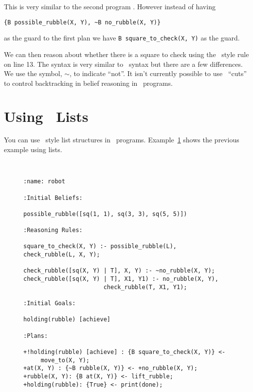 This is very similar to the second program .  However instead of having 
\begin{verbatim}
{B possible_rubble(X, Y), ~B no_rubble(X, Y)}
\end{verbatim}as the guard to the first plan we have \lstinline{B square_to_check(X, Y)} as the guard.

We can then reason about whether there is a square to check using the
\prolog\ style rule on line 13.  The syntax is very similar to
\prolog\ syntax but there are a few
differences.  We use the symbol,
$\sim$, to indicate ``not''.  It isn't currently possible to use
\prolog\ ``cuts'' to control backtracking in belief reasoning in
\gwendolen\ programs. 

\section{Using \prolog\ Lists}
You can use \prolog\ style list structures in \gwendolen\ programs.
Example~\ref{code:pickuprubble_list} shows the previous example using
lists. 
\begin{figure}[htb]
\begin{ourexample}
\label{code:pickuprubble_list} \quad \\
\begin{lstlisting}[basicstyle=\sffamily,style=easslisting,language=Gwendolen]
:name: robot

:Initial Beliefs:

possible_rubble([sq(1, 1), sq(3, 3), sq(5, 5)])

:Reasoning Rules:

square_to_check(X, Y) :- possible_rubble(L), check_rubble(L, X, Y);

check_rubble([sq(X, Y) | T], X, Y) :- ~no_rubble(X, Y);
check_rubble([sq(X, Y) | T], X1, Y1) :- no_rubble(X, Y), 
                       check_rubble(T, X1, Y1);

:Initial Goals:

holding(rubble) [achieve]

:Plans:

+!holding(rubble) [achieve] : {B square_to_check(X, Y)} <-
     move_to(X, Y);
+at(X, Y) : {~B rubble(X, Y)} <- +no_rubble(X, Y);
+rubble(X, Y): {B at(X, Y)} <- lift_rubble;
+holding(rubble): {True} <- print(done);
\end{lstlisting}
\end{ourexample}
\end{figure}


